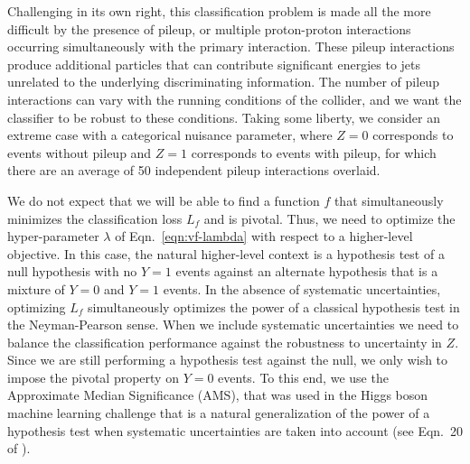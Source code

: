 \documentclass[twocolumn,superscriptaddress,aps]{revtex4-1}
\theoremstyle{plain}
\begin{document}
Challenging in its own right, this classification
problem is made all the more difficult by the presence of pileup, or multiple
 proton-proton interactions occurring simultaneously with the primary
interaction.  These pileup interactions produce additional particles that can
contribute significant energies to jets unrelated to the underlying
discriminating information. The number of pileup interactions can vary with
the running conditions of the collider, and we want the classifier to be robust
to these conditions. Taking some liberty, we consider an extreme case with
a categorical nuisance parameter, where $Z=0$ corresponds to events without pileup
and $Z=1$ corresponds to events with pileup, for which there are an average  of
50 independent pileup interactions overlaid.

We do not expect that we will be able to find a function $f$ that simultaneously
minimizes the classification loss $L_f$ and is pivotal. Thus, we need to optimize
the hyper-parameter $\lambda$ of Eqn.~\ref{eqn:vf-lambda} with respect to
a higher-level objective. In this case, the natural higher-level context is a
hypothesis test of a null hypothesis with no $Y=1$ events against an
alternate hypothesis that is a mixture of $Y=0$ and $Y=1$ events.
In the absence of systematic uncertainties, optimizing $L_f$ simultaneously
optimizes the power of a classical hypothesis test in the Neyman-Pearson sense.
When we include systematic uncertainties we need to balance the
classification performance against the robustness to uncertainty in $Z$.
Since we are still performing a hypothesis test against the null, we only
wish to impose the pivotal property on $Y=0$ events. To this end,
we use the Approximate Median Significance (AMS), that was used
in the Higgs boson machine learning challenge that is a natural generalization
of the power of a hypothesis test when systematic uncertainties are taken into account
(see Eqn.~20 of \citep{adam2014higgs}).

\end{document}
